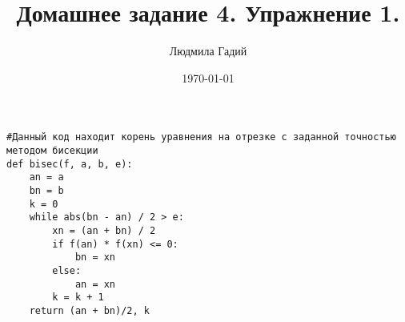 \documentclass[12pt,a4paper, oneside]{report}
\title{Домашнее задание 4. Упражнение 1.}
\author{Людмила Гадий}
\date{\today}
\begin{document}
\maketitle

\begin{verbatim}
#Данный код находит корень уравнения на отрезке с заданной точностью методом бисекции
def bisec(f, a, b, e):
    an = a
    bn = b
    k = 0
    while abs(bn - an) / 2 > e:
        xn = (an + bn) / 2
        if f(an) * f(xn) <= 0:
            bn = xn
        else:
            an = xn
        k = k + 1
    return (an + bn)/2, k
\end{verbatim}
\end{document}

